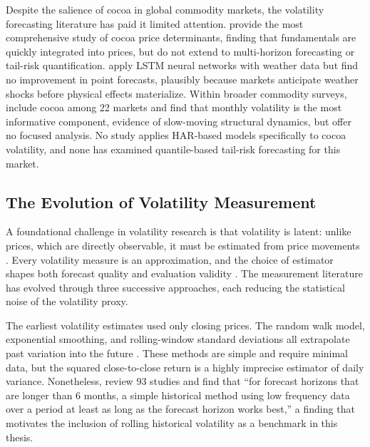Despite the salience of cocoa in global commodity markets, the volatility
forecasting literature has paid it limited attention.
\textcite{benschFinalReportFederal} provide the most comprehensive study
of cocoa price determinants, finding that fundamentals are quickly
integrated into prices, but do not extend to multi-horizon forecasting or
tail-risk quantification. \textcite{berganderDeepLearningCocoa2025} apply
LSTM neural networks with weather data but find no improvement in point
forecasts, plausibly because markets anticipate weather shocks before
physical effects materialize. Within broader commodity surveys,
\textcite{alfeusForecastingVolatilityCommodity2022} include cocoa among
22 markets and find that monthly volatility is the most informative
component, evidence of slow-moving structural dynamics, but offer no
focused analysis. No study applies HAR-based models specifically to cocoa
volatility, and none has examined quantile-based tail-risk forecasting
for this market.

\subsection{The Evolution of Volatility Measurement}
\label{sec:lit-volatility}

A foundational challenge in volatility research is that volatility is
latent: unlike prices, which are directly observable, it must be
estimated from price movements
\parencite{poonForecastingVolatilityFinancial}. Every volatility measure
is an approximation, and the choice of estimator shapes both forecast
quality and evaluation validity
\parencite{pattonVolatilityForecastComparison}. The measurement
literature has evolved through three successive approaches, each
reducing the statistical noise of the volatility proxy.

The earliest volatility estimates used only closing prices. The random
walk model, exponential smoothing, and rolling-window standard deviations
all extrapolate past variation into the future
\parencite{poonForecastingVolatilityFinancial}. These methods are simple
and require minimal data, but the squared close-to-close return is a
highly imprecise estimator of daily variance. Nonetheless,
\textcite{poonForecastingVolatilityFinancial} review 93 studies and find
that ``for forecast horizons that are longer than 6 months, a simple
historical method using low frequency data over a period at least as long
as the forecast horizon works best,'' a finding that motivates the
inclusion of rolling historical volatility as a benchmark in this thesis.

